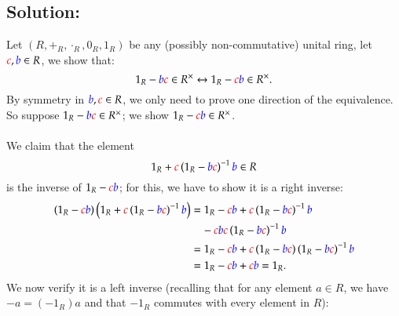 \documentclass[11pt, a4paper, oneside]{article}
\newcommand{\solution}[1][]{\subsection*{#1}\hfill \par}
\theoremstyle{remark}
\theoremstyle{lemma}
\begin{document}
\solution[Solution:]
Let \( (R, +_R, \cdot_R, 0_R, 1_R) \) be any (possibly non-commutative) unital ring, let \(\textcolor{red}{c}, \textcolor{blue}{b} \in R\), we show that:
\[
1_R - \textcolor{blue}{b}\textcolor{red}{c} \in R^{\times} \leftrightarrow 1_R - \textcolor{red}{c}\textcolor{blue}{b} \in R^{\times}.
\]
By symmetry in \( \textcolor{blue}{b}, \textcolor{red}{c} \in R \), we only need to prove one direction of the equivalence. So suppose \( 1_R - \textcolor{blue}{b}\textcolor{red}{c} \in R^{\times} \); we show \( 1_R - \textcolor{red}{c}\textcolor{blue}{b} \in R^{\times} \).
\\\\
We claim that the element
\[
1_R + \textcolor{red}{c} \left( 1_R - \textcolor{blue}{b}\textcolor{red}{c} \right)^{-1} \textcolor{blue}{b}\in R
\]
is the inverse of \( 1_R - \textcolor{red}{c}\textcolor{blue}{b} \); for this, we have to show it is a right inverse:
\[
\begin{aligned}
\left( 1_R - \textcolor{red}{c}\textcolor{blue}{b} \right) \left( 1_R + \textcolor{red}{c} \left( 1_R - \textcolor{blue}{b}\textcolor{red}{c} \right)^{-1} \textcolor{blue}{b} \right)
&= 1_R - \textcolor{red}{c}\textcolor{blue}{b} + \textcolor{red}{c} \left( 1_R - \textcolor{blue}{b}\textcolor{red}{c} \right)^{-1} \textcolor{blue}{b} \\
&\quad - \textcolor{red}{c}\textcolor{blue}{b} \textcolor{red}{c} \left( 1_R - \textcolor{blue}{b}\textcolor{red}{c} \right)^{-1} \textcolor{blue}{b} \\
&= 1_R - \textcolor{red}{c}\textcolor{blue}{b} + \textcolor{red}{c} \left( 1_R - \textcolor{blue}{b}\textcolor{red}{c} \right) \left( 1_R - \textcolor{blue}{b}\textcolor{red}{c} \right)^{-1} \textcolor{blue}{b} \\
&= 1_R - \textcolor{red}{c}\textcolor{blue}{b} + \textcolor{red}{c}\textcolor{blue}{b} = 1_R.
\end{aligned}
\]
We now verify it is a left inverse (recalling that for any element \( a \in R \), we have \( -a = (-1_R)a \) and that \( -1_R \) commutes with every element in \( R \)):
\end{document}
